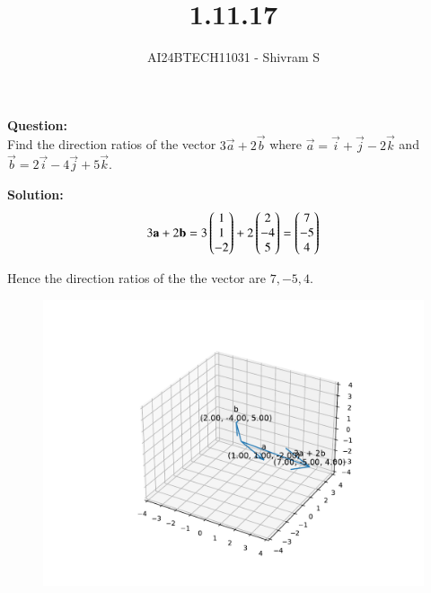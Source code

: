 \documentclass[journal]{IEEEtran}
\begin{document}

\vspace{3cm}

\title{1.11.17}
\author{AI24BTECH11031 - Shivram S
}
{\let\newpage\relax\maketitle}

\renewcommand{\thefigure}{\theenumi}
\renewcommand{\thetable}{\theenumi}
\setlength{\intextsep}{10pt} %


\renewcommand{\thetable}{\theenumi}


\textbf{Question: }\\
Find the direction ratios of the vector $3\vec{a} + 2\vec{b}$ where
$\vec{a} = \vec{i} + \vec{j} - 2\vec{k}$ and $\vec{b} = 2\vec{i} - 4\vec{j} + 5\vec{k}$.

\textbf{Solution: } \\
$$
3\mathbf{a} + 2\mathbf{b} = 3\begin{pmatrix}1 \\ 1 \\ -2\end{pmatrix} + 2\begin{pmatrix}2 \\ -4 \\ 5\end{pmatrix} = \begin{pmatrix}7 \\ -5 \\ 4\end{pmatrix}
$$

Hence the direction ratios of the the vector are $7, -5, 4$.

\begin{figure}[h!]
    \centering
    \includegraphics[width=0.7\linewidth]{figs/fig.pdf}
\end{figure}
\end{document}
